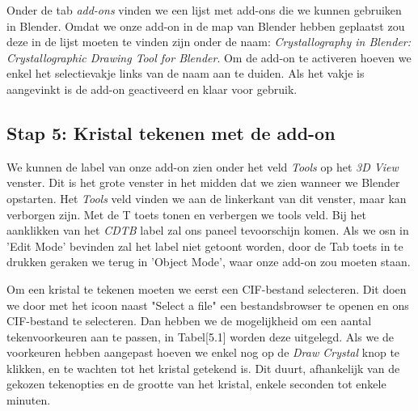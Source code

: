 Onder de tab \textit{add-ons} vinden we een lijst met add-ons die we kunnen gebruiken in Blender. Omdat we onze add-on in de map van Blender hebben geplaatst zou deze in de lijst moeten te vinden zijn onder de naam: \textit{Crystallography in Blender: Crystallographic Drawing Tool for Blender}. Om de add-on te activeren hoeven we enkel het selectievakje links van de naam aan te duiden. Als het vakje is aangevinkt is de add-on geactiveerd en klaar voor gebruik.

\subsection{Stap 5: Kristal tekenen met de add-on}
We kunnen de label van onze add-on zien onder het veld \textit{Tools} op het \textit{3D View} venster. Dit is het grote venster in het midden dat we zien wanneer we Blender opstarten. Het \textit{Tools} veld vinden we aan de linkerkant van dit venster, maar kan verborgen zijn. Met de T toets tonen en verbergen we tools veld. Bij het aanklikken van het \textit{CDTB} label zal ons paneel tevoorschijn komen. Als we osn in 'Edit Mode' bevinden zal het label niet getoont worden, door de Tab toets in te drukken geraken we terug in 'Object Mode', waar onze add-on zou moeten staan.  
\par   


Om een kristal te tekenen moeten we eerst een CIF-bestand selecteren. Dit doen we door met het icoon naast "Select a file" een bestandsbrowser te openen en ons CIF-bestand te selecteren. Dan hebben we de mogelijkheid om een aantal tekenvoorkeuren aan te passen, in Tabel[5.1] worden deze uitgelegd. Als we de voorkeuren hebben aangepast hoeven we enkel nog op de \textit{Draw Crystal} knop te klikken, en te wachten tot het kristal getekend is. Dit duurt, afhankelijk van de gekozen tekenopties en de grootte van het kristal, enkele seconden tot enkele minuten.
\par


